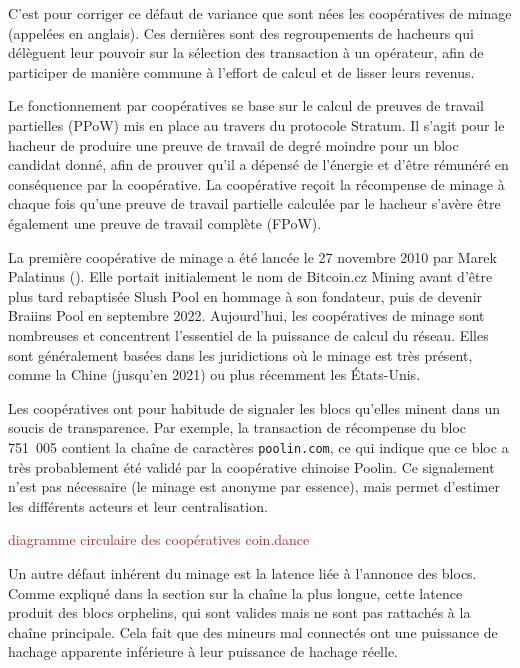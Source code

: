 C'est pour corriger ce défaut de variance que sont nées les coopératives de minage (appelées  en anglais). Ces dernières sont des regroupements de hacheurs qui délèguent leur pouvoir sur la sélection des transaction à un opérateur, afin de participer de manière commune à l'effort de calcul et de lisser leurs revenus.

Le fonctionnement par coopératives se base sur le calcul de preuves de travail partielles (PPoW) mis en place au travers du protocole Stratum. Il s'agit pour le hacheur de produire une preuve de travail de degré moindre pour un bloc candidat donné, afin de prouver qu'il a dépensé de l'énergie et d'être rémunéré en conséquence par la coopérative. La coopérative reçoit la récompense de minage à chaque fois qu'une preuve de travail partielle calculée par le hacheur s'avère être également une preuve de travail complète (FPoW).


La première coopérative de minage a été lancée le 27 novembre 2010 par Marek Palatinus (). Elle portait initialement le nom de Bitcoin.cz Mining avant d'être plus tard rebaptisée Slush Pool en hommage à son fondateur, puis de devenir Braiins Pool en septembre 2022. Aujourd'hui, les coopératives de minage sont nombreuses et concentrent l'essentiel de la puissance de calcul du réseau. Elles sont généralement basées dans les juridictions où le minage est très présent, comme la Chine (jusqu'en 2021) ou plus récemment les États-Unis.

Les coopératives ont pour habitude de signaler les blocs qu'elles minent dans un soucis de transparence. Par exemple, la transaction de récompense du bloc 751~005 contient la chaîne de caractères \texttt{poolin.com}, ce qui indique que ce bloc a très probablement été validé par la coopérative chinoise Poolin. Ce signalement n'est pas nécessaire (le minage est anonyme par essence), mais permet d'estimer les différents acteurs et leur centralisation.


\textcolor{brown}{diagramme circulaire des coopératives coin.dance}


Un autre défaut inhérent du minage est la latence liée à l'annonce des blocs. Comme expliqué dans la section sur la chaîne la plus longue, cette latence produit des blocs orphelins, qui sont valides mais ne sont pas rattachés à la chaîne principale. Cela fait que des mineurs mal connectés ont une puissance de hachage apparente inférieure à leur puissance de hachage réelle.

